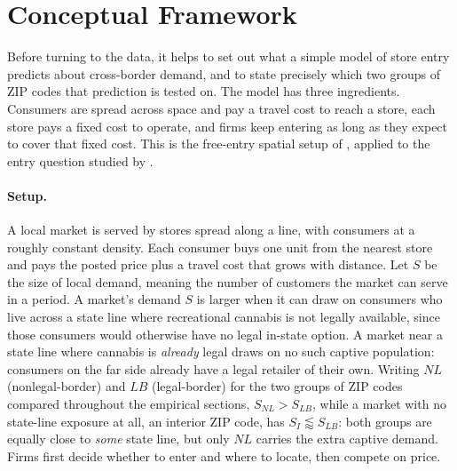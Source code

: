 \documentclass[english,12pt]{article}
\begin{document}
\section{Conceptual Framework}
\label{sec:framework}

Before turning to the data, it helps to set out what a simple model of store entry predicts about cross-border demand, and to state precisely which two groups of ZIP codes that prediction is tested on. The model has three ingredients. Consumers are spread across space and pay a travel cost to reach a store, each store pays a fixed cost to operate, and firms keep entering as long as they expect to cover that fixed cost. This is the free-entry spatial setup of \citet{Salop1979}, applied to the entry question studied by \citet{BresnahanReiss1991}.

\paragraph{Setup.} A local market is served by stores spread along a line, with consumers at a roughly constant density. Each consumer buys one unit from the nearest store and pays the posted price plus a travel cost that grows with distance. Let $S$ be the size of local demand, meaning the number of customers the market can serve in a period. A market's demand $S$ is larger when it can draw on consumers who live across a state line where recreational cannabis is not legally available, since those consumers would otherwise have no legal in-state option. A market near a state line where cannabis is \emph{already} legal draws on no such captive population: consumers on the far side already have a legal retailer of their own. Writing $NL$ (nonlegal-border) and $LB$ (legal-border) for the two groups of ZIP codes compared throughout the empirical sections, $S_{NL} > S_{LB}$, while a market with no state-line exposure at all, an interior ZIP code, has $S_I \lessapprox S_{LB}$: both groups are equally close to \emph{some} state line, but only $NL$ carries the extra captive demand. Firms first decide whether to enter and where to locate, then compete on price.
\end{document}
